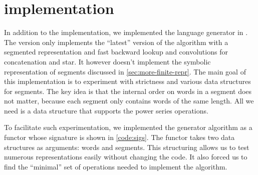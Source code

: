 \section{\ocaml implementation}
\label{sec:ocaml}

\lstset{language=[Objective]Caml}

In addition to the \haskell implementation, we implemented the language generator
in \ocaml.
The \ocaml version only implements the ``latest'' version of the
algorithm with a segmented representation and fast backward lookup and convolutions
for concatenation and star.
It however doesn't implement the symbolic representation of segments
discussed in \cref{sec:more-finite-repr}.
The main goal of this implementation is to experiment with strictness
and various data structures for segments. 
The key idea is that the internal order on words in a segment does not matter,
because each segment only contains words of the same length.
All we need is a data structure that supports the power series
operations.

To facilitate such experimentation, we implemented the generator
algorithm as a functor whose signature is shown in \cref{code:sigs}.
The functor takes two data structures as arguments: words and segments.
This structuring allows us to test numerous representations easily without changing
the code. It also forced us to find the ``minimal'' set of operations
needed to implement the algorithm.

